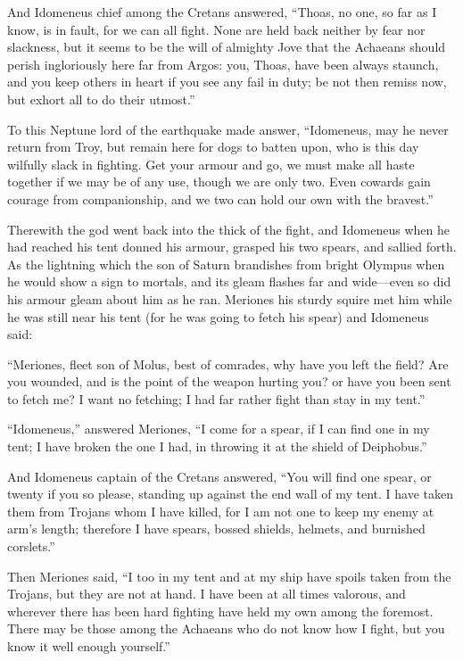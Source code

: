 And Idomeneus chief among the Cretans answered, “Thoas, no one, so far as
I know, is in fault, for we can all fight. None are held back neither by
fear nor slackness, but it seems to be the will of almighty Jove that the
Achaeans should perish ingloriously here far from Argos: you, Thoas, have
been always staunch, and you keep others in heart if you see any fail in
duty; be not then remiss now, but exhort all to do their utmost.”

To this Neptune lord of the earthquake made answer, “Idomeneus, may he
never return from Troy, but remain here for dogs to batten upon, who is
this day wilfully slack in fighting. Get your armour and go, we must make
all haste together if we may be of any use, though we are only two. Even
cowards gain courage from companionship, and we two can hold our own with
the bravest.”

Therewith the god went back into the thick of the fight, and Idomeneus
when he had reached his tent donned his armour, grasped his two spears,
and sallied forth. As the lightning which the son of Saturn brandishes
from bright Olympus when he would show a sign to mortals, and its gleam
flashes far and wide—even so did his armour gleam about him as he
ran. Meriones his sturdy squire met him while he was still near his tent
(for he was going to fetch his spear) and Idomeneus said:

“Meriones, fleet son of Molus, best of comrades, why have you left the
field? Are you wounded, and is the point of the weapon hurting you? or
have you been sent to fetch me? I want no fetching; I had far rather fight
than stay in my tent.”

“Idomeneus,” answered Meriones, “I come for a spear, if I can find one in
my tent; I have broken the one I had, in throwing it at the shield of
Deiphobus.”

And Idomeneus captain of the Cretans answered, “You will find one spear,
or twenty if you so please, standing up against the end wall of my tent. I
have taken them from Trojans whom I have killed, for I am not one to keep
my enemy at arm’s length; therefore I have spears, bossed shields,
helmets, and burnished corslets.”

Then Meriones said, “I too in my tent and at my ship have spoils taken
from the Trojans, but they are not at hand. I have been at all times
valorous, and wherever there has been hard fighting have held my own among
the foremost. There may be those among the Achaeans who do not know how I
fight, but you know it well enough yourself.”


